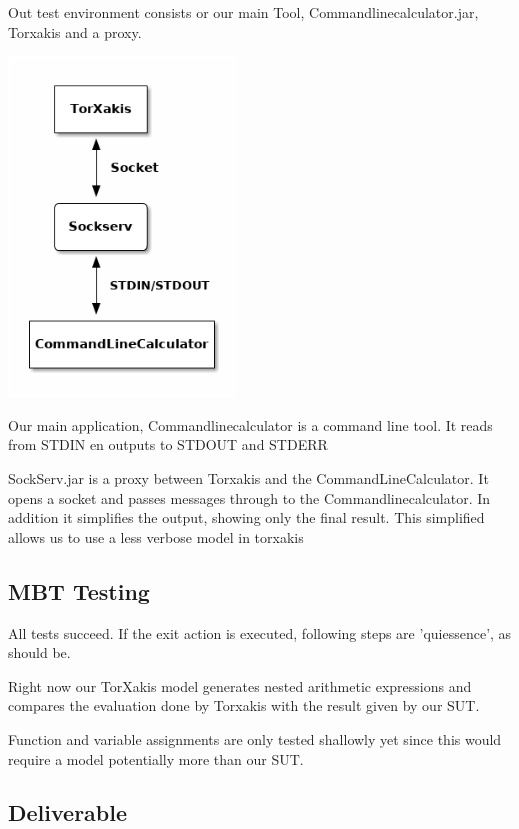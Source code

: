 \documentclass[11pt,a4paper]{article}
\begin{document}
Out test environment consists or our main Tool,
Commandlinecalculator.jar, Torxakis and a proxy.

\includegraphics[width=6cm]{overview.png}

Our main application, Commandlinecalculator is a command line tool. It
reads from STDIN en outputs to STDOUT and STDERR

SockServ.jar is a proxy between Torxakis and the
CommandLineCalculator. It opens a socket and passes messages through
to the Commandlinecalculator. In addition it simplifies the output,
showing only the final result. This simplified allows us to use a less
verbose model in torxakis

\subsection{MBT Testing}
All tests succeed. If the exit action is executed, following steps are 'quiessence', as should be.

Right now our TorXakis model generates nested arithmetic expressions
and compares the evaluation done by Torxakis with the result given by
our SUT.

Function and variable assignments are only tested shallowly yet since this would
require a model potentially more than our SUT.


\subsection{Deliverable}
\end{document}
